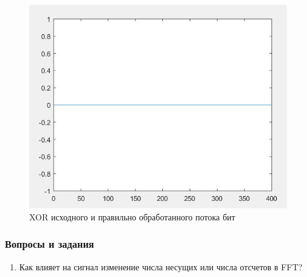 \begin{figure}[h!]
\centering
\includegraphics[]{xor}
\caption{XOR исходного и правильно обработанного потока бит} \label{fg:xor}
\end{figure}

\subsubsection{Вопросы и задания}
\begin{enumerate} %
\item 
Как влияет на сигнал изменение числа несущих или числа отсчетов в FFT?

\end{enumerate}














